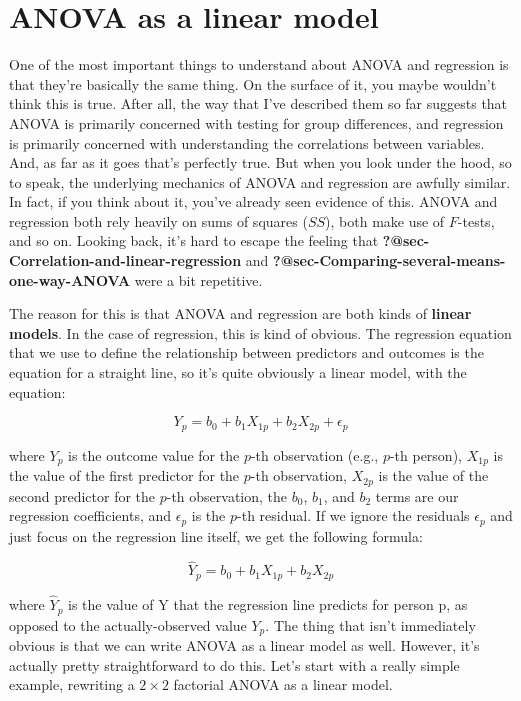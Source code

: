\documentclass[
  a4paper,
]{book}
\begin{document}
\hypertarget{sec-ANOVA-as-a-linear-model}{%
\section{ANOVA as a linear model}\label{sec-ANOVA-as-a-linear-model}}

One of the most important things to understand about ANOVA and
regression is that they're basically the same thing. On the surface of
it, you maybe wouldn't think this is true. After all, the way that I've
described them so far suggests that ANOVA is primarily concerned with
testing for group differences, and regression is primarily concerned
with understanding the correlations between variables. And, as far as it
goes that's perfectly true. But when you look under the hood, so to
speak, the underlying mechanics of ANOVA and regression are awfully
similar. In fact, if you think about it, you've already seen evidence of
this. ANOVA and regression both rely heavily on sums of squares
(\(SS\)), both make use of \(F\)-tests, and so on. Looking back, it's
hard to escape the feeling that
\textbf{?@sec-Correlation-and-linear-regression} and
\textbf{?@sec-Comparing-several-means-one-way-ANOVA} were a bit
repetitive.

The reason for this is that ANOVA and regression are both kinds of
\textbf{linear models}. In the case of regression, this is kind of
obvious. The regression equation that we use to define the relationship
between predictors and outcomes is the equation for a straight line, so
it's quite obviously a linear model, with the equation:

\[Y_p=b_0+b_1 X_{1p} +b_2 X_{2p} + \epsilon_p\]

where \(Y_p\) is the outcome value for the \(p\)-th observation (e.g.,
\(p\)-th person), \(X_{1p}\) is the value of the first predictor for the
\(p\)-th observation, \(X_{2p}\) is the value of the second predictor
for the \(p\)-th observation, the \(b_0\), \(b_1\), and \(b_2\) terms
are our regression coefficients, and \(\epsilon_p\) is the \(p\)-th
residual. If we ignore the residuals \(\epsilon_p\) and just focus on
the regression line itself, we get the following formula:

\[\hat{Y}_p=b_0+b_1 X_{1p} +b_2 X_{2p} \]

where \(\hat{Y}_p\) is the value of Y that the regression line predicts
for person p, as opposed to the actually-observed value \(Y_p\). The
thing that isn't immediately obvious is that we can write ANOVA as a
linear model as well. However, it's actually pretty straightforward to
do this. Let's start with a really simple example, rewriting a
\(2 \times 2\) factorial ANOVA as a linear model.
\end{document}
